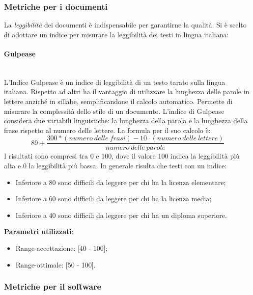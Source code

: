 			
		\subsubsection{Metriche per i documenti}
		
		La \emph{leggibilità} dei documenti è indispensabile per garantirne la qualità. Si è scelto di adottare un indice per misurare la leggibilità dei testi in lingua italiana:
			
			\paragraph{Gulpease}\mbox{} \\
			
			L'Indice Gulpease è un indice di leggibilità di un testo tarato sulla lingua italiana. Rispetto ad altri ha il vantaggio di utilizzare la lunghezza delle parole in lettere anziché in sillabe, semplificandone il calcolo automatico. Permette di misurare la complessità dello stile di un documento.
			L'indice di Gulpease considera due variabili linguistiche: la lunghezza della parola e la lunghezza della frase rispetto al numero delle lettere.
			La formula per il suo calcolo è: \\
			$$
			89 + \frac{300 * (numero\ delle\ frasi) - 10 \cdot (numero\ delle\ lettere)}{numero\ delle\ parole}
			$$
			I risultati sono compresi tra 0 e 100, dove il valore 100 indica la leggibilità più alta e 0 la leggibilità più bassa. In generale risulta che testi con un indice:
			\begin{itemize}
				\item Inferiore a 80 sono difficili da leggere per chi ha la licenza elementare;
				\item Inferiore a 60 sono difficili da leggere per chi ha la licenza media;
				\item Inferiore a 40 sono difficili da leggere per chi ha un diploma superiore.
			\end{itemize}
			\textbf{Parametri utilizzati}:
			\begin{itemize}
				\item Range-accettazione: [40 - 100];
				\item Range-ottimale: [50 - 100].
			\end{itemize}
			
		\subsubsection{Metriche per il software}

